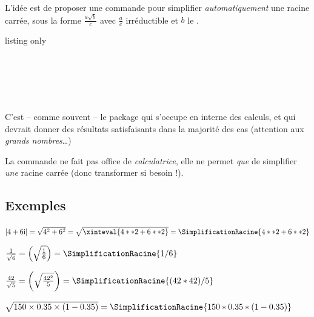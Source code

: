 \begin{tipblock}
 L'idée est de proposer une commande pour simplifier \textit{automatiquement} une racine carrée, sous la forme $\frac{a\sqrt{b}}{c}$ avec $\frac{a}{c}$ irréductible et $b$ le .
\end{tipblock}

\begin{PresCodeTexPL}{listing only}
\end{PresCodeTexPL}

\begin{PresCodePL}{}
 \\ \\
 \\ \\
\end{PresCodePL}

\begin{noteblock}
C'est -- comme souvent -- le package  qui s'occupe en interne des calculs, et qui devrait donner des résultats satisfaisants dans la majorité des cas (attention aux \textit{grands nombres}\ldots)

\smallskip

La commande ne fait pas office de \textit{calculatrice}, elle ne permet \textit{que} de simplifier \textit{une} racine carrée (donc transformer si besoin !).
\end{noteblock}

\subsection{Exemples}

\begin{PresCodePL}{}
$\left| 4+6\text{i}\right| = \sqrt{4^2+6^2} = \sqrt{\xinteval{4**2+6**2}}=\SimplificationRacine{4**2+6**2}$

$\frac{1}{\sqrt{6}}=\left(\sqrt{\frac{1}{6}}\right)=\SimplificationRacine{1/6}$

$\frac{42}{\sqrt{5}}=\left(\sqrt{\frac{42^2}{5}}\right)=\SimplificationRacine{(42*42)/5}$

$\sqrt{\num{150}\times\num{0.35}\times(1-\num{0.35})} = \displaystyle\SimplificationRacine{150*0.35*(1-0.35)}$
\end{PresCodePL}

